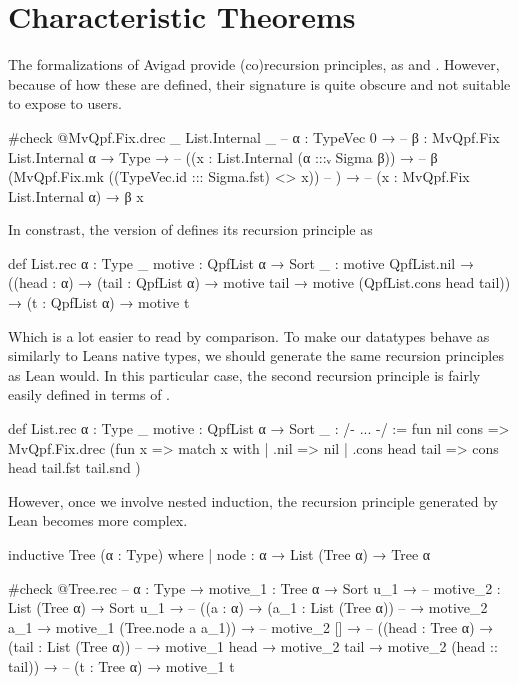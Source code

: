 \section{Characteristic Theorems}

The formalizations of Avigad \etal{} provide (co)recursion principles, as  and .
However, because of how these are defined, their signature is quite obscure and not suitable to expose to users.
\begin{leancode}
  #check @MvQpf.Fix.drec _ List.Internal _
  -- {α : TypeVec 0} →
  --   {β : MvQpf.Fix List.Internal α → Type} →
  --     ((x : List.Internal (α :::ᵥ Sigma β)) → 
  --        β (MvQpf.Fix.mk ((TypeVec.id ::: Sigma.fst) <$$> x))
  --     ) →
  --       (x : MvQpf.Fix List.Internal α) → β x
\end{leancode}

In constrast, the \inductive{} version of  defines its recursion principle as
\begin{leancode}
  def List.rec {α : Type _} {motive : QpfList α → Sort _} :
  motive QpfList.nil 
    → ((head : α) → (tail : QpfList α) → motive tail 
                                          → motive (QpfList.cons head tail))
    → (t : QpfList α) 
    → motive t
\end{leancode}

Which is a lot easier to read by comparison. To make our datatypes behave as similarly to Leans native
\inductive{} types, we should generate the same recursion principles as Lean would.
In this particular case, the second recursion principle is fairly easily defined in terms of .
\begin{leancode}
  def List.rec {α : Type _} {motive : QpfList α → Sort _} : /- ... -/ :=
    fun nil cons => MvQpf.Fix.drec (fun x => 
      match x with
      | .nil            => nil
      | .cons head tail => cons head tail.fst tail.snd
    )
\end{leancode}

However, once we involve nested induction, the recursion principle generated by Lean becomes more complex.

\begin{leancode}
  inductive Tree (α : Type) where
  | node : α → List (Tree α) → Tree α

  #check @Tree.rec
  -- {α : Type} → {motive_1 : Tree α → Sort u_1} →
  --   {motive_2 : List (Tree α) → Sort u_1} →
  --   ((a : α) → (a_1 : List (Tree α)) 
  --        → motive_2 a_1 → motive_1 (Tree.node a a_1)) →
  --   motive_2 [] →
  --   ((head : Tree α) → (tail : List (Tree α)) 
  --        → motive_1 head → motive_2 tail → motive_2 (head :: tail)) →
  --   (t : Tree α) → motive_1 t
\end{leancode}


